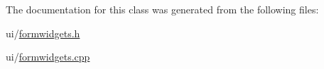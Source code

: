 The documentation for this class was generated from the following files\+:\begin{DoxyCompactItemize}
\item 
ui/\hyperlink{formwidgets_8h}{formwidgets.\+h}\item 
ui/\hyperlink{formwidgets_8cpp}{formwidgets.\+cpp}\end{DoxyCompactItemize}
